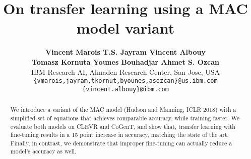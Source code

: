 \documentclass{article}
\title{On transfer learning using a MAC model variant}
\author{
	\textbf{\null\hfill Vincent Marois \hfill T.S. Jayram \hfill Vincent Albouy  \hfill\null}\\
	\textbf{\null\hfill Tomasz Kornuta \hfill Younes Bouhadjar \hfill Ahmet S. Ozcan \hfill\null}\\
	IBM Research AI, Almaden Research Center, San Jose, USA\\
	\texttt{\{vmarois,jayram,tkornut,byounes,asozcan\}@us.ibm.com}\\
	\texttt{\{vincent.albouy\}@ibm.com}\\
}
\begin{document}

\maketitle

\vskip -0.5cm
\begin{abstract}
We introduce a variant of the MAC model (Hudson and Manning, ICLR 2018) with a simplified set of equations that achieves comparable accuracy, while training faster. We evaluate both models on CLEVR and CoGenT, and show that, transfer learning with fine-tuning results in a 15 point increase in accuracy, matching the state of the art. Finally, in contrast, we demonstrate that improper fine-tuning can actually reduce a model's accuracy as well.
\end{abstract}






\newpage


\end{document}
